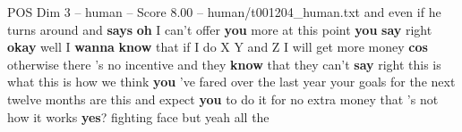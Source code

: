\begin{textsample}{POS Dim 3 – human – Score 8.00 – human/t001204\_human.txt}  \label{ex:f3_pos_008}
and even if he turns around and \textbf{says} \textbf{oh} I can't offer \textbf{you} more at this point \textbf{you} \textbf{say} right \textbf{okay} well I \textbf{wanna} \textbf{know} that if I do X Y and Z I will get more money \textbf{cos} otherwise there 's no incentive and they \textbf{know} that they can't \textbf{say} right this is what this is how we think \textbf{you} 've fared over the last year your goals for the next twelve months are this and expect \textbf{you} to do it for no extra money that 's not how it works \textbf{yes}? fighting face but yeah all the

\end{textsample}
